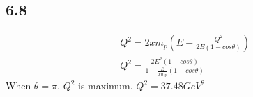 \documentclass{article}
\begin{document}
\begin{CJK*}{GBK}{song}
\section{6.8}
\begin{equation}
\begin{aligned}
&Q^2=2xm_p(E-\frac{Q^2}{2E(1-cos\theta)})\\
&Q^2=\frac{2E^2(1-cos\theta)}{1+\frac{E}{xm_p}(1-cos\theta)}
\end{aligned}
\end{equation}
When $\theta=\pi$, $Q^2$ is maximum. $Q^2=37.48 GeV^2$


\end{CJK*}
\end{document}
